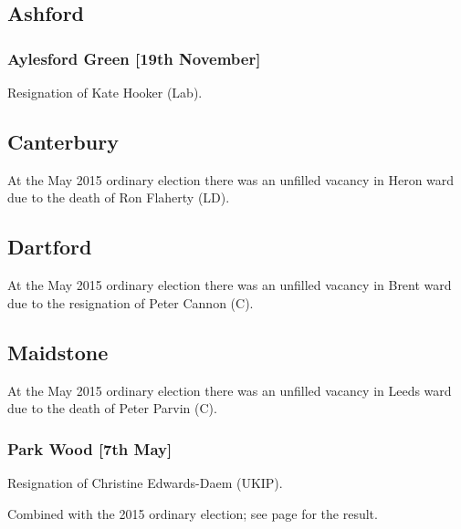 \documentclass[a4paper,openany]{book}
\begin{document}
\begin{resultsiii}
\subsection*{Ashford}

\subsubsection*{Aylesford Green \hspace*{\fill}\nolinebreak[1]%
\enspace\hspace*{\fill}
[19th November]}


Resignation of Kate Hooker (Lab).

\subsection*{Canterbury}

At the May 2015 ordinary election there was an unfilled vacancy in Heron ward due to the death of Ron Flaherty (LD).

\subsection*{Dartford}

At the May 2015 ordinary election there was an unfilled vacancy in Brent ward due to the resignation of Peter Cannon (C).

\subsection*{Maidstone}

At the May 2015 ordinary election there was an unfilled vacancy in Leeds ward due to the death of Peter Parvin (C).

\subsubsection*{Park Wood \hspace*{\fill}\nolinebreak[1]%
\enspace\hspace*{\fill}
[7th May]}


Resignation of Christine Edwards-Daem (UKIP).

Combined with the 2015 ordinary election; see page \pageref{ParkWoodMaidstone} for the result.


\end{resultsiii}
\end{document}
